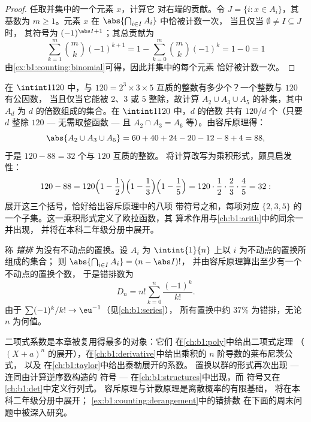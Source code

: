 \begin{proof}
任取并集中的一个元素 $x$，计算它
对右端的贡献。令 $J = \{i : x \in A_i\}$，其基数为 $m \geq
1$。元素 $x$ 在 $\abs{\bigcap_{i \in I} A_i}$ 中恰被计数一次，
当且仅当 $\emptyset \neq I \subseteq J$ 时，
其符号为 $(-1)^{\abs I + 1}$；其总贡献为
\[
\sum_{k=1}^{m} \binom{m}{k} (-1)^{k+1}
= 1 - \sum_{k=0}^{m} \binom mk (-1)^k = 1 - 0 = 1
\]
由\cref{ex:b1:counting:binomial}可得，因此并集中的每个元素
恰好被计数一次。
\end{proof}

\begin{example}[计数互质的整数]\label{ex:b1:counting:coprime}
在 $\intint1{120}$ 中，与 $120 = 2^3
\times 3 \times 5$ 互质的整数有多少个？一个整数与 $120$ 有公因数，
当且仅当它能被 $2$、$3$ 或 $5$ 整除，故计算
$A_2 \cup A_3 \cup A_5$ 的补集，其中 $A_d$ 为
$d$ 的倍数组成的集合。在 $\intint1{120}$ 中，$d$ 的倍数
共有 $120/d$ 个（只要 $d$ 整除 $120$ --- 无需取整函数 --- 且
$A_2 \cap A_3 = A_6$ 等）。由容斥原理得：
\[
\abs{A_2 \cup A_3 \cup A_5}
= 60 + 40 + 24 - 20 - 12 - 8 + 4 = 88 ,
\]
于是 $120 - 88 = 32$ 个与 $120$ 互质的整数。
将计算改写为乘积形式，颇具启发性：
\[
120 - 88 = 120\Bigl(1 - \frac12\Bigr)\Bigl(1 -
\frac13\Bigr)\Bigl(1 - \frac15\Bigr) = 120 \cdot \frac12 \cdot
\frac23 \cdot \frac45 = 32 :
\]
展开这三个括号，恰好给出容斥原理中的八项
带符号之和，每项对应 $\{2, 3,
5\}$ 的一个子集。这一乘积形式定义了欧拉函数，其
算术作用与\cref{ch:b1:arith}中的同余一并出现，
并将在本科二年级分册中展开。
\end{example}

\begin{example}[错排]\label{ex:b1:counting:derangement}
称 \emph{错排} 为没有不动点的置换。设 $A_i$
为 $\intint{1}{n}$ 上以 $i$ 为不动点的置换所组成的集合；
则 $\abs{\bigcap_{i \in I} A_i} = (n - \abs I)!$，
并由容斥原理算出至少有一个不动点的置换个数，
于是错排数为
\[
D_n = n! \sum_{k=0}^{n} \frac{(-1)^k}{k!} .
\]
由于 $\sum (-1)^k / k! \to \eu^{-1}$（见\cref{ch:b1:series}），
所有置换中约 $37\%$ 为错排，无论 $n$ 为何值。
\end{example}

\begin{remark}[本章的应用]\label{rem:b1:counting:whereused}
二项式系数是本章被复用得最多的对象：它们
在\cref{ch:b1:poly}中给出二项式定理
（$(X + a)^n$ 的展开），在\cref{ch:b1:derivative}中给出乘积的 $n$ 阶导数的莱布尼茨公式，
以及
在\cref{ch:b1:taylor}中给出泰勒展开的系数。
置换以群的形式再次出现 --- 连同由计算逆序数构造的
符号 --- 在\cref{ch:b1:structures}中出现，而
符号又在\cref{ch:b1:det}中定义行列式。
容斥原理与计数原理是离散概率的有限基础，
将在本科二年级分册中展开；
\cref{ex:b1:counting:derangement}中的错排数
在下面的周末问题中被深入研究。
\end{remark}

